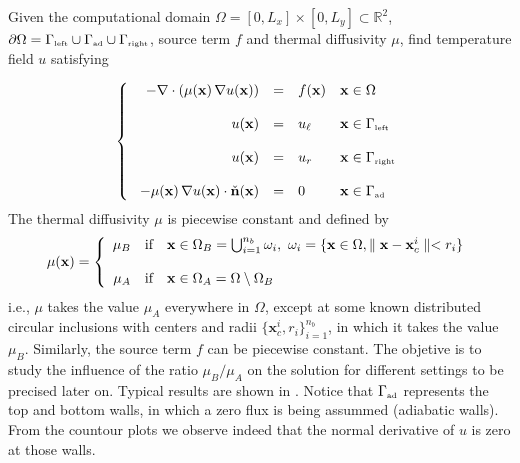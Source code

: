 \begin{kaobox}

Given the computational domain $\Omega = [0,L_x] \times [0,L_y] \subset \mathbb{R}^2$,
$\partial{\Omega} = \Gamma_{\mbox{\tiny left}} \cup\Gamma_{\mbox{\tiny ad}} \cup \Gamma_{\mbox{\tiny right}}$,
source term ${f}$ and thermal diffusivity $\mu$, 
find temperature field ${u}$ satisfying

 \begin{equation}
            \left\{\
            \begin{array}{r l l l }
            - \nabla \cdot \left (\mu (\mathbf{x})\,\nabla {u}(\mathbf{x}) \right ) & = & {f}(\mathbf{x}) & \mathbf{x} \in \Omega \\
            ~\\
            {u}(\mathbf{x}) & = & {u}_{\ell}  & \mathbf{x} \in \Gamma_{\mbox{\tiny left}}\\
            ~\\
            {u}(\mathbf{x})   & = & u_r  & \mathbf{x} \in \Gamma_{\mbox{\tiny right}} \\
            ~\\
            -\mu(\mathbf{x})  \, \nabla{u}(\mathbf{x}) \cdot \check{\mathbf{n}}(\mathbf{x})   & = & 0  & \mathbf{x} \in \Gamma_{\mbox{\tiny ad}} \\
            \end{array}
            \right.\nonumber
\end{equation}
The thermal diffusivity $\mu$ is piecewise constant and defined by
\begin{equation}
            \mu(\mathbf{x}) = \left\{
            \begin{array}{r l l l }
            \mu_B & \mbox{if} & \mathbf{x} \in \Omega_{B} = \bigcup_{i=1}^{n_b} {\omega_i}, ~
            \omega_i = \{ \mathbf{x} \in \Omega, \parallel \mathbf{x} - \mathbf{x}_c^i \parallel < r_i  \}  \\
            ~\\
            \mu_A & \mbox{if} & \mathbf{x} \in \Omega_A = \Omega \setminus \Omega_{B}
            \end{array}
            \right.\nonumber
  \end{equation}
i.e., $\mu$ takes the value $\mu_A$ everywhere in $\Omega$, except at some known 
distributed circular inclusions with centers and radii $\{\mathbf{x}_c^i,r_i\}_{i=1}^{n_b}$, in which 
it takes the value $\mu_B$. Similarly, the source term $f$ can be piecewise constant.
The objetive is to study the influence of the ratio $\mu_B/\mu_A$ on the solution
for different settings to be precised later on. Typical results are shown in .
Notice that $\Gamma_{\mbox{\tiny ad}}$ represents the top and bottom walls, in which a zero flux
is being assummed (adiabatic walls). From the countour plots we observe indeed that the normal
derivative of $u$ is zero at those walls.
\end{kaobox}

